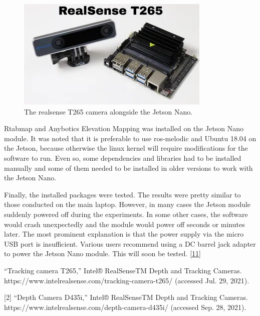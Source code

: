 \documentclass{article}
\begin{document}
\begin{figure}[h] %
    \centering
	\includegraphics[width=\textwidth,height=\textheight,keepaspectratio]{report1-img022.png} %
	\caption{The realsense T265 camera alongside the Jetson Nano. }
\end{figure}


Rtabmap and Anybotics Elevation Mapping was installed on the Jetson Nano module. It was noted that it is preferable to use ros-melodic and Ubuntu 18.04 on the Jetson, because otherwise the linux kernel will require modifications for the software to run. Even so, some dependencies and libraries had to be installed manually and some of them needed to be installed in older versions to work with the Jetson Nano. 

Finally, the installed packages were tested. The results were pretty similar to those conducted on the main laptop. However, in many cases the Jetson module suddenly powered off during the experiments. In some other cases, the software would crash unexpectedly and the module would power off seconds or minutes later. The most prominent explanation is that the power supply via the micro USB port is insufficient. Various users recommend using a DC barrel jack adapter to power the Jetson Nano module. This will soon be tested. \href{https://desertbot.io/blog/jetson-nano-power-supply-barrel-vs-micro-usb}{[11]}

\newpage
[1]	“Tracking camera T265,” Intel® RealSenseTM Depth and Tracking Cameras. https://www.intelrealsense.com/tracking-camera-t265/ (accessed Jul. 29, 2021).
\bigskip

[2]	“Depth Camera D435i,” Intel® RealSenseTM Depth and Tracking Cameras. https://www.intelrealsense.com/depth-camera-d435i/ (accessed Sep. 28, 2021).
\bigskip
\end{document}
